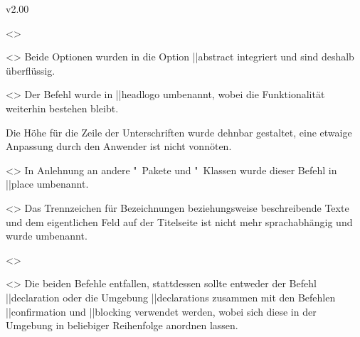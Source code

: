 \begin{Entity}{}
\begin{Changes}{v2.00}
\begin{Obsolete}
\begin{Obsolete}
  {}
  <>
\begin{Obsolete}
  {}
  <>
\printdeclarationlist
%
Beide Optionen wurden in die Option \Option||{abstract} integriert und sind 
deshalb überflüssig.
\end{Obsolete}
\end{Obsolete}

\begin{Obsolete}
  {}
  <>
\printdeclarationlist
%
Der Befehl wurde in \Macro||{headlogo} umbenannt, wobei die Funktionalität 
weiterhin bestehen bleibt.
\end{Obsolete}

\begin{Obsolete}
  {}
\printdeclarationlist
%
Die Höhe für die Zeile der Unterschriften wurde dehnbar gestaltet, eine etwaige 
Anpassung durch den Anwender ist nicht vonnöten.
\end{Obsolete}

\begin{Obsolete}
  {}
  <>
\printdeclarationlist
%
In Anlehnung an andere "~Pakete und "~Klassen wurde 
dieser Befehl in \Macro||{place} umbenannt.
\end{Obsolete}

\begin{Obsolete}
  {}
  <>
\printdeclarationlist
%
Das Trennzeichen für Bezeichnungen beziehungsweise beschreibende Texte und dem 
eigentlichen Feld auf der Titelseite ist nicht mehr sprachabhängig und wurde 
umbenannt.
\end{Obsolete}

\begin{Obsolete}
  {}
  <>
\begin{Obsolete}
  {}
  <>
\printdeclarationlist
%
Die beiden Befehle entfallen, stattdessen sollte entweder der Befehl 
\Macro||{declaration} oder die Umgebung \Environment||{declarations} zusammen 
mit den Befehlen \Macro||{confirmation} und \Macro||{blocking} verwendet 
werden, wobei sich diese in der Umgebung in beliebiger Reihenfolge anordnen 
lassen.
\end{Obsolete}
\end{Obsolete}


\end{Obsolete}
\end{Changes}
\end{Entity}
